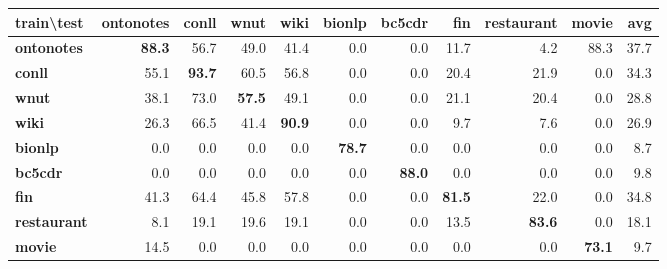 \documentclass[11pt,a4paper]{article}
\begin{document}
\begin{table*}[ht]
\begin{tabular}{l|rrrrrrrrr|r}
\hline
\textbf{train\textbackslash{}test} & \textbf{ontonotes} & \textbf{conll} & \textbf{wnut} & \textbf{wiki} & \textbf{bionlp} & \textbf{bc5cdr} & \textbf{fin}  & \textbf{restaurant} & \textbf{movie} & \textbf{avg} \\ \hline
\textbf{ontonotes}                 & \textbf{88.3}      & 56.7           & 49.0          & 41.4          & 0.0             & 0.0             & 11.7          & 4.2                 & 88.3           & 37.7         \\ \hline
\textbf{conll}                     & 55.1               & \textbf{93.7}  & 60.5          & 56.8          & 0.0             & 0.0             & 20.4          & 21.9                & 0.0            & 34.3         \\\hline
\textbf{wnut}                      & 38.1               & 73.0           & \textbf{57.5} & 49.1          & 0.0             & 0.0             & 21.1          & 20.4                & 0.0            & 28.8         \\\hline
\textbf{wiki}                      & 26.3               & 66.5           & 41.4          & \textbf{90.9} & 0.0             & 0.0             & 9.7           & 7.6                 & 0.0            & 26.9         \\\hline
\textbf{bionlp}                    & 0.0                & 0.0            & 0.0           & 0.0           & \textbf{78.7}   & 0.0             & 0.0           & 0.0                 & 0.0            & 8.7          \\\hline
\textbf{bc5cdr}                    & 0.0                & 0.0            & 0.0           & 0.0           & 0.0             & \textbf{88.0}   & 0.0           & 0.0                 & 0.0            & 9.8          \\\hline
\textbf{fin}                       & 41.3               & 64.4           & 45.8          & 57.8          & 0.0             & 0.0             & \textbf{81.5} & 22.0                & 0.0            & 34.8         \\\hline
\textbf{restaurant}                & 8.1                & 19.1           & 19.6          & 19.1          & 0.0             & 0.0             & 13.5          & \textbf{83.6}       & 0.0            & 18.1         \\\hline
\textbf{movie}                     & 14.5               & 0.0            & 0.0           & 0.0           & 0.0             & 0.0             & 0.0           & 0.0                 & \textbf{73.1}  & 9.7          \\\hline\hline

\end{tabular}
\end{table*}
\end{document}
